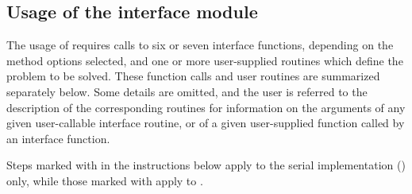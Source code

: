 \subsection{Usage of the {\fcvode} interface module}\label{ss:fcvode_usage}

The usage of {\fcvode} requires calls to six or seven interface
functions, depending on the method options selected, and one or more
user-supplied routines which define the problem to be solved.  These
function calls and user routines are summarized separately below.
Some details are omitted, and the user is referred to the description
of the corresponding {\cvode} routines for information on the arguments 
of any given user-callable interface routine, or of a given user-supplied 
function called by an interface function.

Steps marked with {\s} in the instructions below apply to the serial
{\nvector} implementation ({\nvecs}) only, while those marked with {\p}
apply to {\nvecp}.


